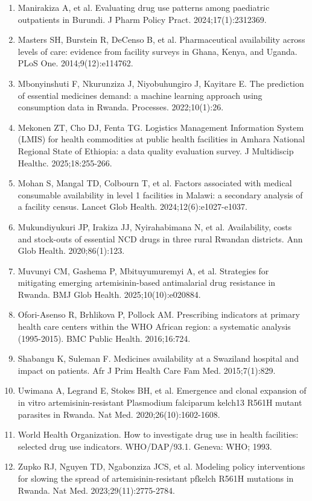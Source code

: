 \documentclass[10pt,a4paper]{article}
\begin{document}
\begin{enumerate}[leftmargin=1.5em]
\item Manirakiza A, et al. Evaluating drug use patterns among paediatric outpatients in Burundi. J Pharm Policy Pract. 2024;17(1):2312369.
\item Masters SH, Burstein R, DeCenso B, et al. Pharmaceutical availability across levels of care: evidence from facility surveys in Ghana, Kenya, and Uganda. PLoS One. 2014;9(12):e114762.
\item Mbonyinshuti F, Nkurunziza J, Niyobuhungiro J, Kayitare E. The prediction of essential medicines demand: a machine learning approach using consumption data in Rwanda. Processes. 2022;10(1):26.
\item Mekonen ZT, Cho DJ, Fenta TG. Logistics Management Information System (LMIS) for health commodities at public health facilities in Amhara National Regional State of Ethiopia: a data quality evaluation survey. J Multidiscip Healthc. 2025;18:255-266.
\item Mohan S, Mangal TD, Colbourn T, et al. Factors associated with medical consumable availability in level 1 facilities in Malawi: a secondary analysis of a facility census. Lancet Glob Health. 2024;12(6):e1027-e1037.
\item Mukundiyukuri JP, Irakiza JJ, Nyirahabimana N, et al. Availability, costs and stock-outs of essential NCD drugs in three rural Rwandan districts. Ann Glob Health. 2020;86(1):123.
\item Muvunyi CM, Gashema P, Mbituyumuremyi A, et al. Strategies for mitigating emerging artemisinin-based antimalarial drug resistance in Rwanda. BMJ Glob Health. 2025;10(10):e020884.
\item Ofori-Asenso R, Brhlikova P, Pollock AM. Prescribing indicators at primary health care centers within the WHO African region: a systematic analysis (1995-2015). BMC Public Health. 2016;16:724.
\item Shabangu K, Suleman F. Medicines availability at a Swaziland hospital and impact on patients. Afr J Prim Health Care Fam Med. 2015;7(1):829.
\item Uwimana A, Legrand E, Stokes BH, et al. Emergence and clonal expansion of in vitro artemisinin-resistant Plasmodium falciparum kelch13 R561H mutant parasites in Rwanda. Nat Med. 2020;26(10):1602-1608.
\item World Health Organization. How to investigate drug use in health facilities: selected drug use indicators. WHO/DAP/93.1. Geneva: WHO; 1993.
\item Zupko RJ, Nguyen TD, Ngabonziza JCS, et al. Modeling policy interventions for slowing the spread of artemisinin-resistant pfkelch R561H mutations in Rwanda. Nat Med. 2023;29(11):2775-2784.
\end{enumerate}
\end{document}
